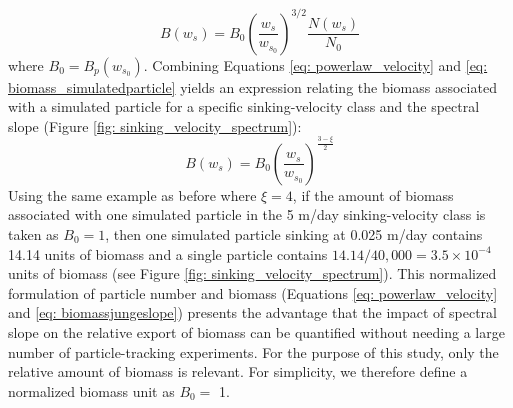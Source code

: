 \documentclass[draft,linenumbers]{agujournal2018}
\begin{document}
\begin{equation}
	B(w_s) =  B_0\left(\frac{w_s}{w_{s_0}}\right)^{3/2}\frac{N(w_s)}{N_0}
	\label{eq: biomass_simulatedparticle}
\end{equation}
where $B_0 = B_p(w_{s_0})$. Combining Equations \ref{eq: powerlaw_velocity} and \ref{eq: biomass_simulatedparticle} yields an expression relating the biomass associated with a simulated particle for a specific sinking-velocity class and the spectral slope (Figure \ref{fig: sinking_velocity_spectrum}):
\begin{equation}
	B(w_s) = B_0\left(\frac{w_s}{w_{s_0}}\right)^{\frac{3-\xi}{2}}
	\label{eq: biomassjungeslope}
\end{equation}
Using the same example as before where $\xi = 4$, if the amount of biomass associated with one simulated particle in the 5 m/day sinking-velocity class is taken as $B_0 = 1$, then one simulated particle sinking at 0.025 m/day contains 14.14 units of biomass and a single particle contains $14.14/40,000 =3.5\times10^{-4}$ units of biomass (see Figure \ref{fig: sinking_velocity_spectrum}). This normalized formulation of particle number and biomass (Equations \ref{eq: powerlaw_velocity} and \ref{eq: biomassjungeslope}) presents the advantage that the impact of spectral slope on the relative export of biomass can be quantified without needing a large number of particle-tracking experiments. For the purpose of this study, only the relative amount of biomass is relevant. For simplicity, we therefore define a normalized biomass unit as $B_0=$ 1.
\end{document}
